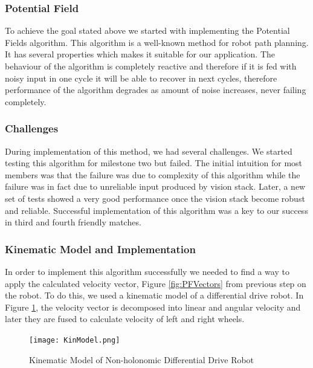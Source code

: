 \subsubsection{Potential Field}
To achieve the goal stated above we started with implementing the Potential Fields\cite{paper:PF} algorithm. This algorithm is a well-known method for robot path planning. It has several properties which makes it suitable for our application. The behaviour of the algorithm is completely reactive and therefore if it is fed with noisy input in one cycle it will be able to recover in next cycles, therefore performance of the algorithm degrades as amount of noise increases, never failing completely.\linebreak

\subsubsection{Challenges}
During implementation of this method, we had several challenges. We started testing this algorithm for milestone two but failed. The initial intuition for most members was that the failure was due to complexity of this algorithm while the failure was in fact due to unreliable input produced by vision stack. Later, a new set of tests showed a very good performance once the vision stack become robust and reliable. Successful implementation of this algorithm was a key to our success in third and fourth friendly matches.\linebreak

\subsubsection{Kinematic Model and Implementation}
In order to implement this algorithm successfully we needed to find a way to apply the calculated velocity vector, Figure \ref{fig:PFVectors} from previous step on the robot. To do this, we used a kinematic model of a differential drive robot. In Figure \ref{fig:KinModel}, the velocity vector is decomposed into linear and angular velocity and later they are fused to calculate velocity of left and right wheels.
\begin{figure}[htp]
\begin{center}
\leavevmode
\texttt{[image: KinModel.png]}
\end{center}
\caption{Kinematic Model of Non-holonomic Differential Drive Robot}
\label{fig:KinModel}
\end{figure}

